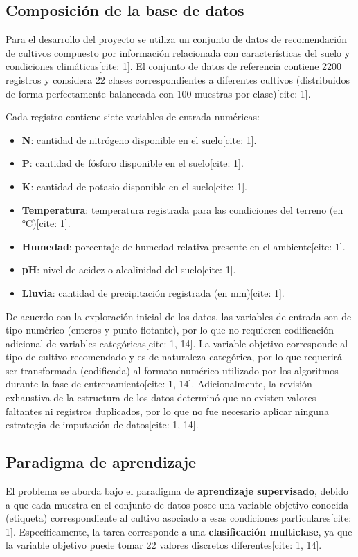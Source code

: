 \documentclass[conference]{IEEEtran}
\begin{document}
\subsection{Composición de la base de datos}
Para el desarrollo del proyecto se utiliza un conjunto de datos de recomendación de cultivos compuesto por información relacionada con características del suelo y condiciones climáticas[cite: 1]. El conjunto de datos de referencia contiene 2200 registros y considera 22 clases correspondientes a diferentes cultivos (distribuidos de forma perfectamente balanceada con 100 muestras por clase)[cite: 1].

Cada registro contiene siete variables de entrada numéricas:
\begin{itemize}
    \item \textbf{N}: cantidad de nitrógeno disponible en el suelo[cite: 1].
    \item \textbf{P}: cantidad de fósforo disponible en el suelo[cite: 1].
    \item \textbf{K}: cantidad de potasio disponible en el suelo[cite: 1].
    \item \textbf{Temperatura}: temperatura registrada para las condiciones del terreno (en °C)[cite: 1].
    \item \textbf{Humedad}: porcentaje de humedad relativa presente en el ambiente[cite: 1].
    \item \textbf{pH}: nivel de acidez o alcalinidad del suelo[cite: 1].
    \item \textbf{Lluvia}: cantidad de precipitación registrada (en mm)[cite: 1].
\end{itemize}

De acuerdo con la exploración inicial de los datos, las variables de entrada son de tipo numérico (enteros y punto flotante), por lo que no requieren codificación adicional de variables categóricas[cite: 1, 14]. La variable objetivo corresponde al tipo de cultivo recomendado y es de naturaleza categórica, por lo que requerirá ser transformada (codificada) al formato numérico utilizado por los algoritmos durante la fase de entrenamiento[cite: 1, 14]. Adicionalmente, la revisión exhaustiva de la estructura de los datos determinó que no existen valores faltantes ni registros duplicados, por lo que no fue necesario aplicar ninguna estrategia de imputación de datos[cite: 1, 14].

\subsection{Paradigma de aprendizaje}
El problema se aborda bajo el paradigma de \textbf{aprendizaje supervisado}, debido a que cada muestra en el conjunto de datos posee una variable objetivo conocida (etiqueta) correspondiente al cultivo asociado a esas condiciones particulares[cite: 1]. Específicamente, la tarea corresponde a una \textbf{clasificación multiclase}, ya que la variable objetivo puede tomar 22 valores discretos diferentes[cite: 1, 14].
\end{document}
